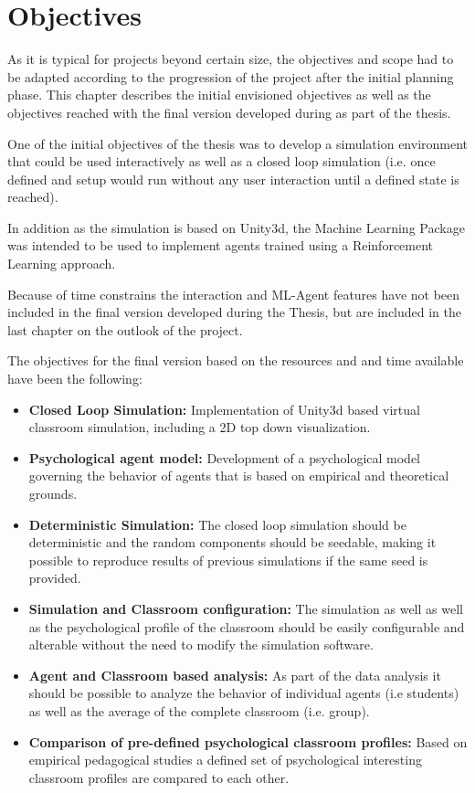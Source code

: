 \chapter{Objectives}
As it is typical for projects beyond certain size, the objectives and scope had to
be adapted according to the progression of the project after the initial planning phase.
This chapter describes the initial envisioned objectives as well as the objectives
reached with the final version developed during as part of the thesis.

One of the initial objectives of the thesis was to develop a simulation environment that
could be used interactively as well as a closed loop simulation (i.e. once defined
and setup would run without any user interaction until a defined state is reached).

In addition as the simulation is based on Unity3d, the Machine Learning Package
was intended to be used to implement agents trained using a Reinforcement Learning approach.

Because of time constrains the interaction and ML-Agent features have not been included
in the final version developed during the Thesis, but are included in the last chapter
on the outlook of the project.

\bb

The objectives for the final version based on the resources and and time available
have been the following:

\begin{itemize}
    \item \textbf{Closed Loop Simulation:} Implementation of Unity3d based virtual
    classroom simulation, including a 2D top down visualization.
    \item \textbf{Psychological agent model:} Development of a psychological model
    governing the behavior of agents that is based on empirical and theoretical grounds.
    \item \textbf{Deterministic Simulation:} The closed loop simulation should be
    deterministic and the random components should be seedable, making it possible
    to reproduce results of previous simulations if the same seed is provided.
    \item \textbf{Simulation and Classroom configuration:} The simulation as well
    as well as the psychological profile of the classroom should be easily configurable
    and alterable without the need to modify the simulation software.
    \item \textbf{Agent and Classroom based analysis:} As part of the data analysis
    it should be possible to analyze the behavior of individual agents (i.e students)
    as well as the average of the complete classroom (i.e. group).
    \item \textbf{Comparison of pre-defined psychological classroom profiles:} Based
    on empirical pedagogical studies a defined set of psychological interesting classroom
    profiles are compared to each other.
\end{itemize}

